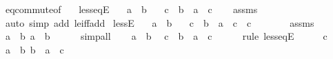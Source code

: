 \begin{isabellebody}
\ eq{\isacharunderscore}{\kern0pt}commute{\isacharbrackleft}{\kern0pt}of\ {}{\isacharbrackright}{\kern0pt}\ \isacommand{{\isachardot}{\kern0pt}}\isamarkupfalse%
%
\endisatagproof
{\isafoldproof}%
%
\isadelimproof
\isanewline
%
\endisadelimproof
\isanewline
{}\isamarkupfalse%
\ less{\isacharunderscore}{\kern0pt}eqE{\isacharcolon}{\kern0pt}\isanewline
\ \ \ {\isacartoucheopen}a\ {\isasymle}\ b{\isacartoucheclose}\isanewline
\ \ \ c\ \ {\isacartoucheopen}b\ {\isacharequal}{\kern0pt}\ a\ {\isacharplus}{\kern0pt}\ c{\isacartoucheclose}\isanewline
%
\isadelimproof
\ \ %
\endisadelimproof
%
\isatagproof
{}\isamarkupfalse%
\ assms\ \isamarkupfalse%
\ {\isacharparenleft}{\kern0pt}auto\ simp\ add{\isacharcolon}{\kern0pt}\ le{\isacharunderscore}{\kern0pt}iff{\isacharunderscore}{\kern0pt}add{\isacharparenright}{\kern0pt}%
\endisatagproof
{\isafoldproof}%
%
\isadelimproof
\isanewline
%
\endisadelimproof
\isanewline
{}\isamarkupfalse%
\ lessE{\isacharcolon}{\kern0pt}\isanewline
\ \ \ {\isacartoucheopen}a\ {\isacharless}{\kern0pt}\ b{\isacartoucheclose}\isanewline
\ \ \ c\ \ {\isacartoucheopen}b\ {\isacharequal}{\kern0pt}\ a\ {\isacharplus}{\kern0pt}\ c{\isacartoucheclose}\ \ {\isacartoucheopen}c\ {\isasymnoteq}\ {}{\isacartoucheclose}\isanewline
%
\isadelimproof
%
\endisadelimproof
%
\isatagproof
{}\isamarkupfalse%
\ {\isacharminus}{\kern0pt}\isanewline
\ \ \isamarkupfalse%
\ assms\ \isamarkupfalse%
\ {\isacartoucheopen}a\ {\isasymle}\ b{\isacartoucheclose}\ {\isacartoucheopen}a\ {\isasymnoteq}\ b{\isacartoucheclose}\isanewline
\ \ \ \ \isamarkupfalse%
\ simp{\isacharunderscore}{\kern0pt}all\isanewline
\ \ \isamarkupfalse%
\ {\isacartoucheopen}a\ {\isasymle}\ b{\isacartoucheclose}\ \isamarkupfalse%
\ c\ \ {\isacartoucheopen}b\ {\isacharequal}{\kern0pt}\ a\ {\isacharplus}{\kern0pt}\ c{\isacartoucheclose}\isanewline
\ \ \ \ \isamarkupfalse%
\ {\isacharparenleft}{\kern0pt}rule\ less{\isacharunderscore}{\kern0pt}eqE{\isacharparenright}{\kern0pt}\isanewline
\ \ \isamarkupfalse%
\ \isamarkupfalse%
\ {\isacartoucheopen}c\ {\isasymnoteq}\ {}{\isacartoucheclose}\ \isamarkupfalse%
\ {\isacartoucheopen}a\ {\isasymnoteq}\ b{\isacartoucheclose}\ {\isacartoucheopen}b\ {\isacharequal}{\kern0pt}\ a\ {\isacharplus}{\kern0pt}\ c{\isacartoucheclose}\isanewline

\end{isabellebody}
